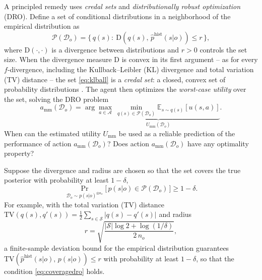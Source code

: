 \documentclass[journal]{IEEEtran}
\theoremstyle{definition}
\theoremstyle{remark}
\newcommand{\E}{\mathbb{E}}
\newcommand{\Sset}{\mathcal{S}}
\newcommand{\Dset}{\mathcal{D}}
\newcommand{\Pset}{\mathcal{P}}
\newcommand{\TV}{\mathrm{TV}}
\begin{document}
A principled remedy uses \emph{credal sets} and \emph{distributionally robust
optimization} (DRO). Define a set of conditional distributions in a
neighborhood of the empirical distribution as
\begin{equation}
\label{eq:klball}
\Pset(\Dset_o)=\bigl\{\,q(s):\ \mathrm D\!\left(q(s),\,\hat p^{\text{hist}}(s| o)\right)\le r\,\bigr\},
\end{equation}
where $\mathrm D(\cdot,\cdot)$ is a divergence between distributions and $r>0$
controls the set size. When the divergence measure  $\mathrm D$ is convex in its first argument -- as
for every $f$-divergence, including the Kullback--Leibler (KL) divergence and
total variation (TV) distance -- the set \eqref{eq:klball} is a \emph{credal
set}: a closed, convex set of probability distributions \cite{walley1991}.
The agent then optimizes the \emph{worst-case utility} over the set, solving
the DRO problem
\begin{equation}\label{eq:mmaction}
a_{\mathrm{mm}}(\Dset_o)=\arg\underbrace{\max_{a\in \mathcal{A}}\ \min_{q(s)\in \Pset(\Dset_o)} \E_{s\sim q(s)}[u(s,a)]}_{U_{\mathrm{mm}}(\Dset_o)}.
\end{equation} { When can the estimated utility $U_{\mathrm{mm}}$ be used as a reliable prediction of the performance of action $a_{\mathrm{mm}}(\Dset_o)$? Does action $a_{\mathrm{mm}}(\Dset_o)$ have any optimality property?}


Suppose the divergence and radius are chosen so that the set covers the true
posterior with probability at least $1-\delta$,
\begin{equation}
\label{eq:coveragedro}
\Pr_{\Dset_o\sim p(s| o)^{\otimes n_o}}\!\bigl[\,p(s| o)\in\Pset(\Dset_o)\,\bigr]\ge 1-\delta.
\end{equation}
For example, with the total variation (TV)  distance
$\TV(q(s),q'(s))=\tfrac12\sum_{s\in\Sset}|q(s)-q'(s)|$ and radius
\begin{equation}
\label{eq:radius}
r=\sqrt{\frac{|\Sset|\log 2+\log(1/\delta)}{2\,n_o}},
\end{equation}
a finite-sample deviation bound for the empirical distribution
\cite{weissman2003l1} guarantees
$\TV(\hat p^{\text{hist}}(s| o),\,p(s| o))\le r $ with probability at
least $1-\delta$, so that the condition  \eqref{eq:coveragedro} holds.
\end{document}
